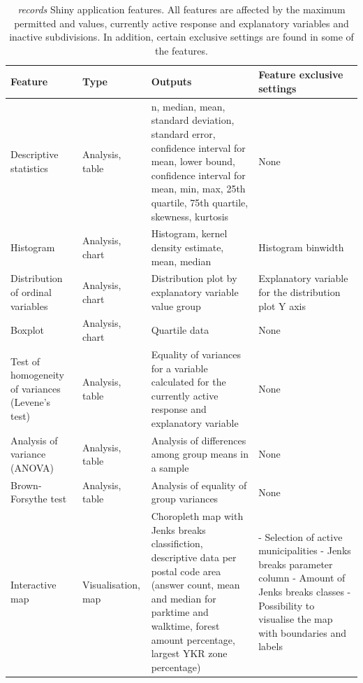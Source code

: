 \begin{table}[H]
    \centering
    \caption[Records Shiny application features]{\textit{records} Shiny application features. All features are affected by the maximum permitted  and  values, currently active response and explanatory variables and inactive subdivisions. In addition, certain exclusive settings are found in some of the features.}
    \label{tab:records_shiny_features}
    \scalebox{0.8}
    {\def\arraystretch{1.3}
    \setlength\tabcolsep{1.2ex}
    \begin{tabular}{ @{} >{\raggedright\arraybackslash}p{3cm} >{\raggedright\arraybackslash}p{2cm} >{\raggedright\arraybackslash}p{6cm} >{\raggedright\arraybackslash}p{6cm} @{} }
        \toprule
        Feature & Type & Outputs & Feature exclusive settings \\
        \midrule
        1 Descriptive statistics & Analysis, table & n, median, mean, standard deviation, standard error, confidence interval for mean, lower bound, confidence interval for mean, min, max, 25th quartile, 75th quartile, skewness, kurtosis & None \\
        2 Histogram & Analysis, chart & Histogram, kernel density estimate, mean, median & Histogram binwidth \\
        3 Distribution of ordinal variables & Analysis, chart & Distribution plot by explanatory variable value group & Explanatory variable for the distribution plot Y axis \\
        4 Boxplot & Analysis, chart & Quartile data & None \\
        5 Test of homogeneity of variances (Levene's test) & Analysis, table & Equality of variances for a variable calculated for the currently active response and explanatory variable & None \\
        6 Analysis of variance (ANOVA) & Analysis, table & Analysis of differences among group means in a sample & None \\
        7 Brown-Forsythe test & Analysis, table & Analysis of equality of group variances & None \\
        8 Interactive map & Visualisation, map & Choropleth map with Jenks breaks classifiction, descriptive data per postal code area (answer count, mean and median for parktime and walktime, forest amount percentage, largest YKR zone percentage) & - Selection of active municipalities \linebreak - Jenks breaks parameter column \linebreak - Amount of Jenks breaks classes \linebreak - Possibility to visualise the map with boundaries and labels \\
        \bottomrule
    \end{tabular}}
\end{table} 

